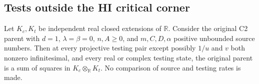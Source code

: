 \subsection{Tests outside the HI critical corner}
\label{component:pcee1372511ed}

\label{pcee1372511ed:sec:hi-remote}
\begin{theorem}
Let $K_c,K_t$ be independent real closed extensions of $\mathbb R$.
Consider the original C2 parent with $d=1$, $\lambda=\beta=0$,
$n,A\geq0$, and $m,C,D,\alpha$ positive unbounded source numbers.
Then at every projective testing pair except possibly
$1/u$ and $v$ both nonzero infinitesimal, and every real or complex testing
state, the
original parent is a sum of squares in $K_c\otimes_{\mathbb R}K_t$.
No comparison of source and testing rates is made.
\end{theorem}

